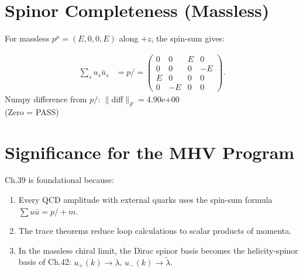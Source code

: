 \documentclass[12pt]{article}
\begin{document}
\section{Spinor Completeness (Massless)}\label{sec:spin_completeness}

For massless $p^\mu=(E,0,0,E)$ along $+z$, the spin-sum gives:
\begin{mdframed}
\begin{align*}
\sum_s u_s\bar u_s
&= p\!\!\!/ = \begin{pmatrix}
0&0&E&0\\0&0&0&-E\\E&0&0&0\\0&-E&0&0
\end{pmatrix} .
\end{align*}
Numpy difference from $p\!\!\!/$: $\|$diff$\|_F = $4.90e+00 \\
(Zero = PASS)
\end{mdframed}

\section{Significance for the MHV Program}

Ch.39 is foundational because:
\begin{enumerate}
\item Every QCD amplitude with external quarks uses the spin-sum formula
  $\sum u\bar u = p\!\!\!/+m$.
\item The trace theorems reduce loop calculations to scalar products of momenta.
\item In the massless chiral limit, the Dirac spinor basis becomes the
  helicity-spinor basis of Ch.42: $u_+(k)\to\lambda$, $u_-(k)\to\tilde\lambda$.
\end{enumerate}
\end{document}
